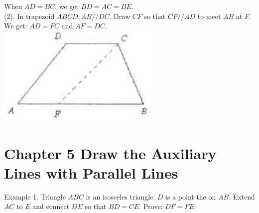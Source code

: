 \documentclass[10pt]{article}
\begin{document}
When \(A D=B C\), we get \(B D=A C=B E\).\\
(2). In trapezoid \(A B C D, A B / / D C\). Draw \(C F\) so that \(C F / / A D\) to meet \(A B\) at \(F\). We get: \(A D=F C\) and \(A F=D C\).\\
\includegraphics[max width=\textwidth, center]{2025_04_17_97bc1f7e44d93c271a88g-101(2)}

\section*{Chapter 5 Draw the Auxiliary Lines with Parallel Lines}
Example 1. Triangle \(A B C\) is an isosceles triangle. \(D\) is a point the on \(A B\). Extend \(A C\) to \(E\) and connect \(D E\) so that \(B D=C E\). Prove: \(D F=F E\).
\end{document}
